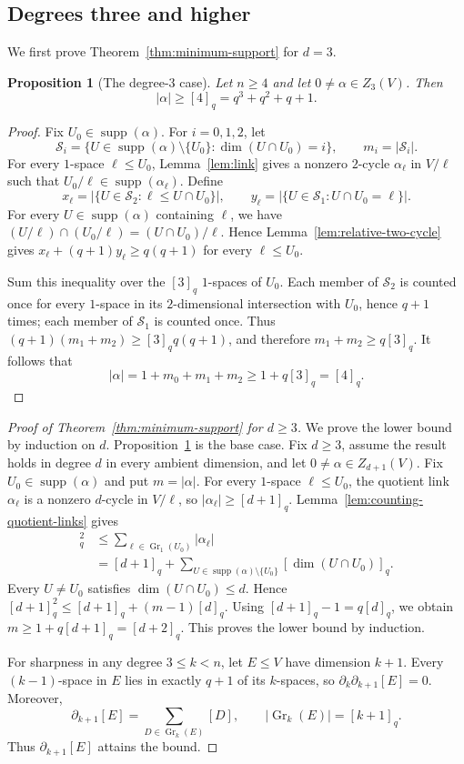\documentclass[11pt]{article}
\numberwithin{equation}{section}
\newtheorem{proposition}[theorem]{Proposition}
\newcommand{\Gr}{\operatorname{Gr}}
\newcommand{\supp}{\operatorname{supp}}
\begin{document}
\subsection{Degrees three and higher}

We first prove Theorem~\ref{thm:minimum-support} for $d=3$.
\begin{proposition}[The degree-$3$ case]\label{prop:d3}
Let $n\ge4$ and let $0\ne\alpha\in Z_3(V)$. Then
\[
 |\alpha|\ge[4]_q=q^3+q^2+q+1.
\]
\end{proposition}

\begin{proof}
Fix $U_0\in\supp(\alpha)$. For $i=0,1,2$, let
\[
 \mathcal S_i=
 \{U\in\supp(\alpha)\setminus\{U_0\}:\dim(U\cap U_0)=i\},
 \qquad m_i=|\mathcal S_i|.
\]
For every $1$-space $\ell\le U_0$, Lemma~\ref{lem:link} gives a
nonzero $2$-cycle $\alpha_\ell$ in $V/\ell$ such that
$U_0/\ell\in\supp(\alpha_\ell)$. Define
\[
 x_\ell=
 |\{U\in\mathcal S_2:\ell\le U\cap U_0\}|,
 \qquad
 y_\ell=
 |\{U\in\mathcal S_1:U\cap U_0=\ell\}|.
\]
For every $U\in\supp(\alpha)$ containing $\ell$, we have
$(U/\ell)\cap(U_0/\ell)=(U\cap U_0)/\ell$. Hence
Lemma~\ref{lem:relative-two-cycle} gives
$x_\ell+(q+1)y_\ell\ge q(q+1)$ for every $\ell\le U_0$.

Sum this inequality over the $[3]_q$ $1$-spaces of $U_0$. Each member
of $\mathcal S_2$ is counted once for every $1$-space in its
$2$-dimensional intersection with $U_0$, hence $q+1$ times; each
member of $\mathcal S_1$ is counted once. Thus
$(q+1)(m_1+m_2)\ge[3]_q q(q+1)$, and therefore
$m_1+m_2\ge q[3]_q$. It follows that
\[
 |\alpha|
 =1+m_0+m_1+m_2
 \ge1+q[3]_q=[4]_q.
\]
\end{proof}

\begin{proof}[Proof of Theorem~\ref{thm:minimum-support} for $d\ge3$]
We prove the lower bound by induction on $d$.
Proposition~\ref{prop:d3} is the base case. Fix $d\ge3$, assume the
result holds in degree $d$ in every ambient dimension, and let
$0\ne\alpha\in Z_{d+1}(V)$.
Fix $U_0\in\supp(\alpha)$ and put $m=|\alpha|$. For every
$1$-space $\ell\le U_0$, the quotient link $\alpha_\ell$ is a
nonzero $d$-cycle in $V/\ell$, so
$|\alpha_\ell|\ge[d+1]_q$.
Lemma~\ref{lem:counting-quotient-links} gives
\begin{align*}
 [d+1]_q^2
 &\le
 \sum_{\ell\in\Gr_1(U_0)}|\alpha_\ell|\\
 &=
 [d+1]_q+
 \sum_{U\in\supp(\alpha)\setminus\{U_0\}}
 [\dim(U\cap U_0)]_q.
\end{align*}
Every $U\ne U_0$ satisfies $\dim(U\cap U_0)\le d$. Hence
$[d+1]_q^2\le[d+1]_q+(m-1)[d]_q$.
Using $[d+1]_q-1=q[d]_q$, we obtain
$m\ge1+q[d+1]_q=[d+2]_q$.
This proves the lower bound by induction.

For sharpness in any degree $3\le k<n$, let $E\le V$ have dimension
$k+1$.
Every $(k-1)$-space in $E$ lies in exactly $q+1$ of its $k$-spaces,
so $\partial_k\partial_{k+1}[E]=0$. Moreover,
\[
 \partial_{k+1}[E]
 =\sum_{D\in\Gr_k(E)}[D],
 \qquad
 |\Gr_k(E)|=[k+1]_q.
\]
Thus $\partial_{k+1}[E]$ attains the bound.
\end{proof}
\end{document}
